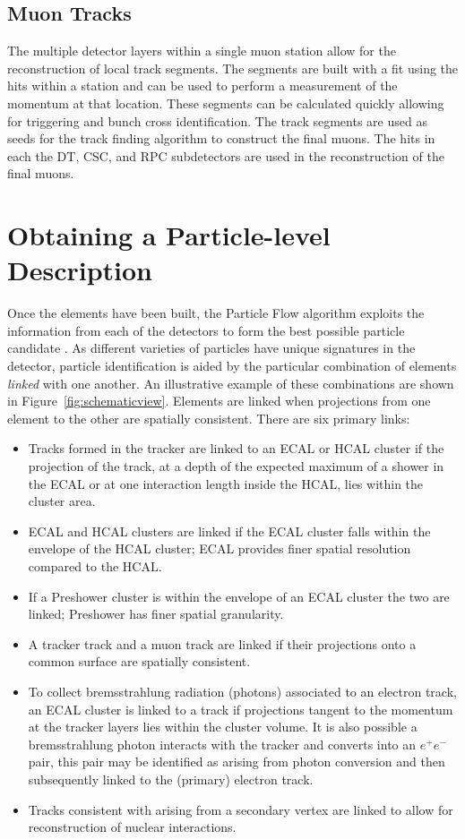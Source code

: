 \subsection{Muon Tracks}

The multiple detector layers within a single muon station allow for the reconstruction of local track segments. The segments are built with a fit using the hits within a station and can be used to perform a measurement of the momentum at that location. These segments can be calculated quickly allowing for triggering and bunch cross identification. The track segments are used as seeds for the track finding algorithm to construct the final muons. The hits in each the DT, CSC, and RPC subdetectors are used in the reconstruction of the final muons.

\section{Obtaining a Particle-level Description}

Once the elements have been built, the Particle Flow algorithm exploits the information from each of the detectors to form the best possible particle candidate \cite{CMS-PRF-14-001}. As different varieties of particles have unique signatures in the detector, particle identification is aided by the particular combination of elements \textit{linked} with one another. An illustrative example of these combinations are shown in Figure~\ref{fig:schematicview}.  Elements are linked when projections from one element to the other are spatially consistent. There are six primary links:

\begin{itemize}
\item Tracks formed in the tracker are linked to an ECAL or HCAL cluster if the projection of the track, at a depth of the expected maximum of a shower in the ECAL or at one interaction length inside the HCAL, lies within the cluster area.
\item ECAL and HCAL clusters are linked if the ECAL cluster falls within the envelope of the HCAL cluster; ECAL provides finer spatial resolution compared to the HCAL.
\item If a Preshower cluster is within the envelope of an ECAL cluster the two are linked; Preshower has finer spatial granularity.
\item A tracker track and a muon track are linked if their projections onto a common surface are spatially consistent.
\item To collect bremsstrahlung radiation (photons) associated to an electron track, an ECAL cluster is linked to a track if projections tangent to the momentum at the tracker layers lies within the cluster volume. It is also possible a bremsstrahlung photon interacts with the tracker and converts into an $e^{+}e^{-}$ pair, this pair may be identified as arising from photon conversion and then subsequently linked to the (primary) electron track.
\item Tracks consistent with arising from a secondary vertex are linked to allow for reconstruction of nuclear interactions.
\end{itemize}

